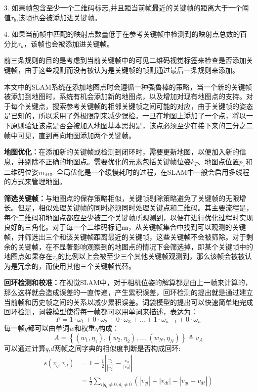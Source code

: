 3. 如果帧包含至少一个二维码标志,并且距当前帧最近的关键帧的距离大于一个阈值$\tau_b$,该帧也会被添加进关键帧。

4. 如果当前帧中匹配的映射点数量低于在参考关键帧中检测到的映射点总数的百分比$\tau_k$，该帧也会被添加进关键帧。

前三条规则的目的是考虑到当前关键帧中的可见二维码视觉标签来检查是否添加关键帧，由于这些规则而没有被认为是关键帧的帧则通过最后一条规则来添加。

本文中的SLAM系统在添加地图点时会遵循一种强鲁棒的策略，当一个新的关键帧被添加到地图时，系统有机会添加新的地图点，以及增加对现有地图点的支持。对于每个关键点，搜索参考关键帧的相邻关键帧之间可能的对应，由于关键帧的姿态是已知的，所以采用了外极限制来减少误检。一旦在地图上添加了一个点，将以一下原则验证该点是否会被加入地图基本思想是，该点必须至少在接下来的三分之二帧中可见，直到再向地图添加两个关键帧。

\textbf{地图优化：}在添加新的关键帧或检测到闭环时，需要更新地图，以便加入新的信息，并剔除不正确的地图点。需要优化的元素包括关键帧位姿$k_T$、地图点位置$p_x$和二维码位姿$m_M$。全局优化是一个缓慢耗时的过程，在SLAM中一般会启用多线程的方式来管理地图。

\textbf{筛选关键帧：}与地图点的保存策略相似，关键帧剔除策略避免了关键帧的无限增长。但是，相似处理关键帧的同时必须同时处理关键点和二维码。其主要流程是，每个二维码和地图点都应至少被三个关键帧所观测到，以便在进行优化过程时实现良好的三角化。对于每一个二维码标记$\mathbf{m}$，从关键帧集合中找到可以观测的关键帧，并筛选出三个和该关键帧距离最近的关键帧，这些关键帧不会被筛除。对于剩余的关键帧，在不显著影响观察到的地图点的情况下会筛选掉，即某个关键帧中的地图点如果存在$\tau_c$的比例以上会被至少三个其他关键帧观测到，那么该帧会被被认为是冗余的，而使用其他三个关键帧代替。

\textbf{回环检测和校准：}在视觉SLAM中，对于相机位姿的解算都是由上一帧来计算的，那么这样就会造成误差的一直传递，产生累积误差，回环检测的提出就是通过建立当前帧和历史帧之间的关系以减少累积误差。词袋模型的提出可以快速简单地完成回环检测，词袋模型使得每一帧都可以用单词来描述，表达为：
\begin{equation}
  F=1 \cdot \omega_{1}+0 \cdot \omega_{2}+0 \cdot \omega_{3}+\ldots+1 \cdot \omega_{n-1}+0 \cdot \omega_{n}
\end{equation}
每一帧$q$都可以由单词$w$和权重$\eta$构成：
\begin{equation}
  A=\left\{\left(w_{1}, \eta_{1}\right),\left(w_{2}, \eta_{2}\right), \ldots,\left(w_{N}, \eta_{N}\right)\right\} \triangleq v_{A}
\end{equation}
可以通过计算$q$,$d$两帧之间字典的相似度判断是否构成回环:
\begin{equation}
  \begin{aligned} s\left(v_{q}, v_{d}\right) &=1-\frac{1}{2}\left|\frac{v_{q}}{\left|v_{q}\right|}-\frac{v_{d}}{\left|v_{d}\right|}\right| \\ &=\frac{1}{2} \sum_{i | q_{i} \neq 0, d_{i} \neq 0}\left(\left|v_{q i}\right|+\left|v_{d i}\right|-\left|v_{q i}-v_{d i}\right|\right) \end{aligned}
\end{equation}

